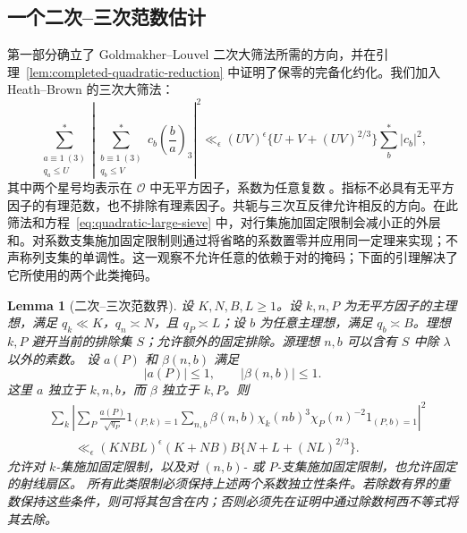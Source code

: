 \documentclass[11pt,a4paper]{article}
\numberwithin{equation}{section}
\numberwithin{figure}{section}
\newtheorem{lemma}[theorem]{Lemma}
\theoremstyle{definition}
\theoremstyle{remark}
\begin{document}
\subsection{一个二次--三次范数估计}第一部分确立了 Goldmakher--Louvel 二次大筛法所需的方向，并在引理~\ref{lem:completed-quadratic-reduction} 中证明了保零的完备化约化。我们加入 Heath--Brown 的三次大筛法：
\begin{equation}\label{eq:cubic-large-sieve}
 \sum_{\substack{a\equiv1\ (3)\\q_a\le U}}^{*}
 \left|\sum_{\substack{b\equiv1\ (3)\\q_b\le V}}^{*}
           c_b\left(\frac ba\right)_3\right|^2
 \ll_\epsilon (UV)^\epsilon
       \{U+V+(UV)^{2/3}\}\sum_b^{*}|c_b|^2,
\end{equation}
其中两个星号均表示在 \(\mathcal O\) 中无平方因子，系数为任意复数 \cite[Theorem 2]{HB}。指标不必具有无平方因子的有理范数，也不排除有理素因子。共轭与三次互反律允许相反的方向。在此筛法和方程~\eqref{eq:quadratic-large-sieve} 中，对行集施加固定限制会减小正的外层和。对系数支集施加固定限制则通过将省略的系数置零并应用同一定理来实现；不声称列支集的单调性。这一观察不允许任意的依赖于对的掩码；下面的引理解决了它所使用的两个此类掩码。

\begin{lemma}[二次--三次范数界]\label{lem:hybrid-energy}
设 \(K,N,B,L\ge1\)。设 \(k,n,P\) 为无平方因子的主理想，满足
\(q_k\ll K\)，\(q_n\asymp N\)，且 \(q_P\asymp L\)；设 \(b\) 为任意主理想，满足 \(q_b\asymp B\)。理想 \(k,P\) 避开当前的排除集 \(S\)；允许额外的固定排除。源理想 \(n,b\) 可以含有 \(S\) 中除 \(\lambda\) 以外的素数。
设 \(a(P)\) 和 \(\beta(n,b)\)
满足
\[
 |a(P)|\le1,\qquad |\beta(n,b)|\le1.
\]
这里 \(a\) 独立于 \(k,n,b\)，而 \(\beta\) 独立于
\(k,P\)。则
\begin{equation}\label{old-eq:4.6b}
 \begin{split}
 &\sum_k\left|
 \sum_P\frac{a(P)}{\sqrt{q_P}}1_{(P,k)=1}
 \sum_{n,b}\beta(n,b)\chi_k(nb)^3
                 \chi_P(n)^{-2}1_{(P,b)=1}
 \right|^2\\
 &\qquad\ll_\epsilon
 (KNBL)^\epsilon(K+NB)B\{N+L+(NL)^{2/3}\}.
 \end{split}
\end{equation}
允许对 \(k\)-集施加固定限制，以及对
\((n,b)\)- 或 \(P\)-支集施加固定限制，也允许固定的射线扇区。
所有此类限制必须保持上述两个系数独立性条件。若除数有界的重数保持这些条件，则可将其包含在内；否则必须先在证明中通过除数柯西不等式将其去除。
\end{lemma}
\end{document}
